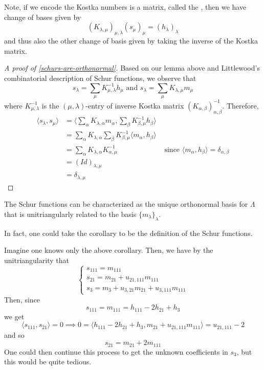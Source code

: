 \documentclass[11pt,leqno,oneside]{amsart}
\numberwithin{thm}{section}
\newcommand{\sym}{\Lambda}
\begin{document}
\begin{rmk}
  Note, if we encode the Kostka numbers is a matrix, called the
  , then we have change of bases given by \[
    (K_{\lambda,\mu})_{\mu,\lambda} (s_\mu)_{\mu} = (h_\lambda)_{\lambda}
  \]
  and thus also the other change of basis given by taking the inverse
  of the Kostka matrix.
\end{rmk}
\begin{proof}[A proof of \ref{schurs-are-orthonormal}]
  Based on our lemma above and Littlewood's combinatorial description
  of Schur functions, we observe that \[
    s_\lambda = \sum_{\mu} K_{\mu,\lambda}^{-1} h_\mu \text{ and }
    s_\lambda = \sum_{\mu} K_{\lambda,\mu} m_\mu
  \]
  where \(K_{\mu,\lambda}^{-1}\) is the \((\mu,\lambda)\)-entry of
  inverse Kostka matrix
  \((K_{\alpha,\beta})_{\alpha,\beta}^{-1}\). Therefore,
  \begin{align*}
    \langle s_\lambda, s_\mu \rangle
    & = \langle \sum_{\alpha} K_{\lambda,\alpha} m_\alpha,
      \sum_{\beta} K_{\beta, \mu}^{-1} h_\beta \rangle\\
    & = \sum_{\alpha} K_{\lambda,\alpha} \sum_{\beta}
      K_{\beta,\mu}^{-1} \langle m_\alpha, h_\beta \rangle \\
    & = \sum_{\alpha} K_{\lambda, \alpha} K_{\alpha, \mu}^{-1}
    & \text{ since }\langle m_\alpha, h_\beta \rangle =
      \delta_{\alpha,\beta} \\
    & = (Id)_{\lambda,\mu} \\
    & = \delta_{\lambda,\mu}
  \end{align*}
\end{proof}
\begin{cor}
  The Schur functions can be characterized as the unique orthonormal
  basis for \(\sym\) that is unitriangularly related to the basis
  \(\{m_\lambda\}_{\lambda}\). 
\end{cor}
In fact, one could take the corollary to be the definition of the
Schur functions.
\begin{example}
  Imagine one knows only the above corollary. Then, we have by the
  unitriangularity that\[
    \begin{cases}
      s_{111} = m_{111} \\
      s_{21} = m_{21} + u_{21,111} m_{111}\\
      s_3 = m_3 + u_{3,21} m_{21} + u_{3,111}m_{111}
    \end{cases}
  \]
  Then, since \[
    s_{111} = m_{111} = h_{111}-2h_{21}+h_3
  \]
  we get
  \[
    \langle s_{111},s_{21} \rangle = 0 \implies 0 = \langle
    h_{111}-2h_{21}+h_3, 
    m_{21} + u_{21,111} m_{111} \rangle = u_{21,111}-2
  \]
  and so \[
    s_{21} = m_{21} + 2m_{111}
  \]
  One could then continue this process to get the unknown coefficients
  in \(s_3\), but this would be quite tedious.
\end{example}
\end{document}
